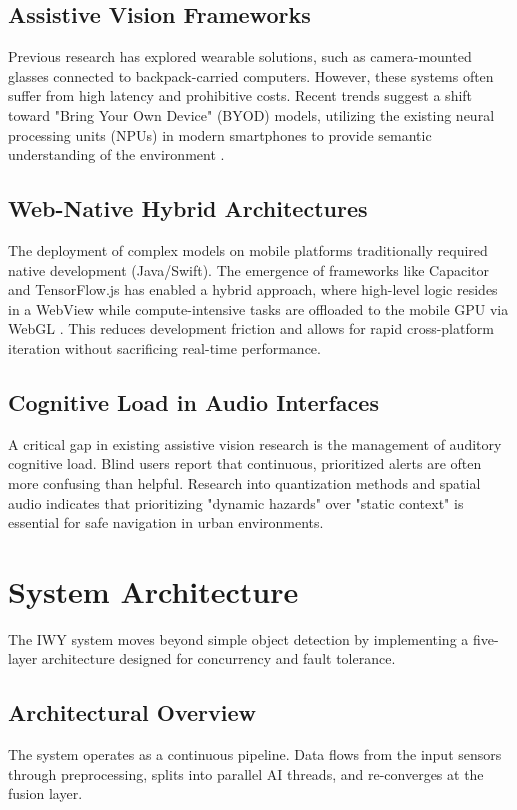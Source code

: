 \documentclass[11pt, a4paper, twocolumn]{article}
\begin{document}
\subsection{Assistive Vision Frameworks}
Previous research has explored wearable solutions, such as camera-mounted glasses connected to backpack-carried computers. However, these systems often suffer from high latency and prohibitive costs. Recent trends suggest a shift toward "Bring Your Own Device" (BYOD) models, utilizing the existing neural processing units (NPUs) in modern smartphones to provide semantic understanding of the environment \cite{edge_ai}.

\subsection{Web-Native Hybrid Architectures}
The deployment of complex models on mobile platforms traditionally required native development (Java/Swift). The emergence of frameworks like Capacitor and TensorFlow.js has enabled a hybrid approach, where high-level logic resides in a WebView while compute-intensive tasks are offloaded to the mobile GPU via WebGL \cite{tfjs, capacitor}. This reduces development friction and allows for rapid cross-platform iteration without sacrificing real-time performance.

\subsection{Cognitive Load in Audio Interfaces}
A critical gap in existing assistive vision research is the management of auditory cognitive load. Blind users report that continuous, prioritized alerts are often more confusing than helpful. Research into quantization methods \cite{quantization} and spatial audio indicates that prioritizing "dynamic hazards" over "static context" is essential for safe navigation in urban environments.

\section{System Architecture}
The IWY system moves beyond simple object detection by implementing a five-layer architecture designed for concurrency and fault tolerance.

\subsection{Architectural Overview}
The system operates as a continuous pipeline. Data flows from the input sensors through preprocessing, splits into parallel AI threads, and re-converges at the fusion layer.
\end{document}
